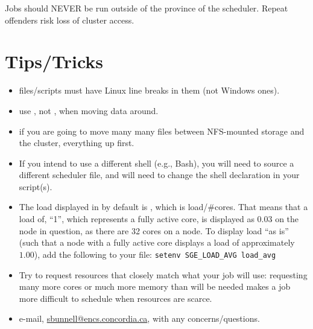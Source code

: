 \documentclass{easychair}
\begin{document}
Jobs should NEVER be run outside of the province of the scheduler. Repeat offenders  risk loss of cluster access. 

\section{Tips/Tricks}

\begin{itemize}
\item
files/scripts must have Linux line breaks in them (not Windows ones).
\item
use , not , when moving data around. 
\item
if you are going to move many many files between NFS-mounted storage and the 
cluster,  everything up first. 
\item
If you intend to use a different shell (e.g., Bash), you will need to source a different scheduler file, and will need to change the shell declaration in your script(s).
\item
The load displayed in  by default is , which is load/\#cores. That means that a load of, ``1'', which represents a fully active core, is displayed as $0.03$ on the  node in question, as there are 32 cores on a node. To display load ``as is'' (such that a node with a fully active core displays a load of approximately $1.00$), add the following to your  file: \texttt{setenv SGE\_LOAD\_AVG load\_avg}
\item
Try to request resources that closely match what your job will use: requesting many  more cores or much more memory than will be needed makes a job more difficult to schedule when resources are scarce.  
\item
e-mail, \url{sbunnell@encs.concordia.ca}, with any concerns/questions.
\end{itemize}

%
\label{sect:bib}

%
%
%


\end{document}
